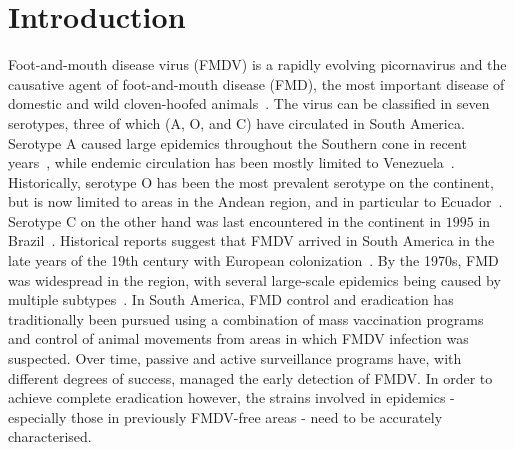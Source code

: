 \documentclass[10pt]{article}
\begin{document}
\section*{Introduction}

Foot-and-mouth disease virus (FMDV) is a rapidly evolving picornavirus and the causative agent of foot-and-mouth disease (FMD), the most important disease of domestic and wild cloven-hoofed animals~\cite{review}.
The virus can be classified in seven serotypes, three of which (A, O, and C) have circulated in South America.
Serotype A caused large epidemics throughout the Southern cone in recent years~\cite{Perez2001, Malirat2012}, while endemic circulation has been mostly limited to Venezuela~\cite{Malirat2012}.
Historically, serotype O has been the most prevalent serotype on the continent, but is now limited to areas in the Andean region, and in particular to Ecuador~\cite{andean}.
Serotype C on the other hand was last encountered in the continent in $1995$ in Brazil~\cite{review_eradication}.
Historical reports suggest that FMDV arrived in South America in the late years of the 19th century with European colonization~\cite{Naranjo2013, tully}. 
By the 1970s, FMD was widespread in the region, with several large-scale epidemics being caused by multiple subtypes~\cite{Saraiva2003}.
In South America, FMD control and eradication has traditionally been pursued using a combination of mass vaccination programs~\cite{vaccinationSA} and control of animal movements from areas in which FMDV infection was suspected.
Over time, passive and active surveillance programs have, with different degrees of success, managed the early detection of FMDV.
In order to achieve complete eradication however, the strains involved in epidemics - especially those in previously FMDV-free areas - need to be accurately characterised.
\end{document}
